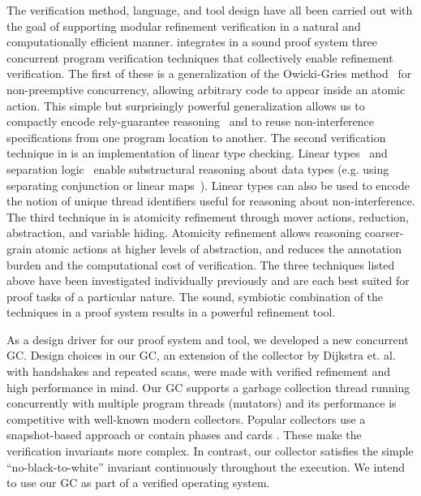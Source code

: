 The verification method, language, and tool design have all been carried out with the goal of supporting  modular refinement verification in a natural and computationally efficient manner. 
\civl integrates in a sound proof system three concurrent program verification techniques that collectively enable refinement verification. 
The first of these is a generalization of the Owicki-Gries method~\cite{OwickiG76} for non-preemptive concurrency, 
allowing arbitrary code to appear inside an atomic action. 
This simple but surprisingly powerful generalization allows us to compactly encode rely-guarantee reasoning~\cite{Jones83}
and to reuse non-interference specifications from one program location to another.
The second verification technique in \civl is an implementation of linear type checking.
Linear types~\cite{Wadler90lineartypes} and separation logic~\cite{Reynolds02} enable substructural reasoning about data types
(e.g. using separating conjunction or linear maps~\cite{LahiriQW11}).
Linear types can also be used to encode the notion of unique thread identifiers useful for reasoning about non-interference. 
The third technique in \civl is atomicity refinement through mover actions, reduction, abstraction, and variable hiding. 
Atomicity refinement allows reasoning coarser-grain atomic actions at higher levels of abstraction, and reduces the annotation burden and the computational cost of verification. 
The three techniques listed above have been investigated individually previously and are each best suited for proof tasks of a particular nature. 
The sound, symbiotic combination of the techniques in a proof system results in a powerful refinement tool. 

As a design driver for our proof system and tool, we developed a new concurrent GC. 
Design choices in our GC, an extension of the collector by Dijkstra et. al. \cite{dijk78}  with handshakes \cite{doli93,doli94} and repeated scans, were made with verified refinement and high performance in mind. 
Our GC supports a garbage collection thread running concurrently with multiple program threads (mutators) and its performance is competitive with well-known modern collectors. 
Popular collectors use a snapshot-based approach \cite{doli93,doli94,doma00,azat03} or contain phases and cards \cite{boeh91,prin00a,bara05}. These make the verification invariants more complex. In contrast, 
our collector satisfies the simple ``no-black-to-white'' invariant continuously throughout the execution. We intend to use our GC as part of a verified operating system. 

